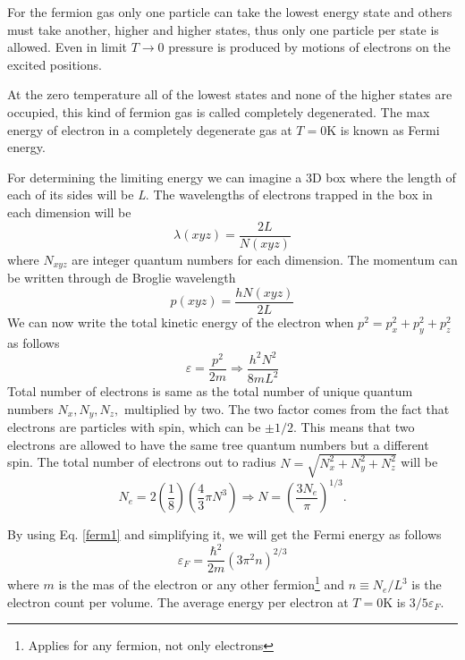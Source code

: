 \documentclass[oneside,a4paper,11pt]{report}
\begin{document}
For the fermion gas only one particle can take the lowest energy state and others must 
take another, higher and higher states, thus only one particle per state is allowed. 
Even in limit $T\rightarrow0$ pressure is produced by motions of electrons on the excited positions.       

At the zero temperature all of the lowest states and none of the higher states are 
occupied, this kind of fermion gas is called completely degenerated. 
The max energy of electron in a completely degenerate gas at $T=0 \mathrm{K}$ is known as Fermi energy. 

For determining the limiting energy we can imagine a 3D box where the length of each of its sides will be \textit{L}.  
The wavelengths of electrons trapped in the box in each dimension will be
\begin{equation}
\lambda (xyz) = \frac{2L}{N{(xyz)}}
\end{equation}
where $N_{xyz}$ are integer quantum numbers for each dimension. The momentum can be written 
through de Broglie wavelength
\begin{equation}
p(xyz) = \frac{hN(xyz)}{2L}
\end{equation}
We can now write the total kinetic energy of the electron when $p^2 = p_x^2 + p_y^2 + p_z^2$ as follows
\begin{equation}
\label{ferm1}
 \varepsilon =  \frac{p^2}{2m} \Rightarrow \frac{h^2N^2}{8mL^2}
\end{equation}
Total number of electrons is same as the total number of unique quantum numbers $N_x, N_y, N_z,$ multiplied by 
two. The two factor comes from the fact that electrons are particles with spin, which can be $\pm 1/2$. 
This means that two electrons are allowed to have the same tree quantum numbers but a different spin. 
The total number of electrons out to radius $N = \sqrt{N_x^2 + N_y^2 + N_z^2}$ will be
\begin{equation}
 N_e = 2\left ( \frac{1}{8} \right )\left ( \frac{4}{3} \pi N^3\right ) \Rightarrow N = \left ( \frac{3N_e}{\pi} \right )^{1/3} .
\end{equation}

By using Eq. \eqref{ferm1} and simplifying it, we will get the Fermi energy as follows
\begin{equation}
\varepsilon_F = \frac{\hbar^2}{2m}\left ( 3\pi^2n \right )^{2/3}
\end{equation}
where $m$ is the mas of the electron or any other fermion\footnote{Applies for any fermion, not only electrons} 
and $n\equiv N_e/L^3$ is the electron count per volume. 
The average energy per electron at $T = 0\mathrm{K}$ is $3/5\varepsilon_F$.    
  
\end{document}
